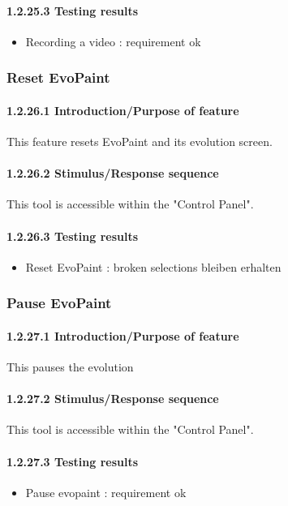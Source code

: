 \documentclass[titlepage,12pt]{scrartcl}
\begin{document}
\paragraph{1.2.25.3 Testing results}
\begin{itemize}
	\item Recording a video	: requirement ok
\end{itemize}


\subsubsection{Reset EvoPaint}
\paragraph{1.2.26.1 Introduction/Purpose of feature}
This feature resets EvoPaint and its evolution screen.
\paragraph{1.2.26.2 Stimulus/Response sequence}
This tool is accessible within the "Control Panel". 
\paragraph{1.2.26.3 Testing results}
\begin{itemize}
	\item Reset EvoPaint	: broken selections bleiben erhalten
\end{itemize}


\subsubsection{Pause EvoPaint}
\paragraph{1.2.27.1 Introduction/Purpose of feature}
This pauses the evolution
\paragraph{1.2.27.2 Stimulus/Response sequence}
This tool is accessible within the "Control Panel". 
\paragraph{1.2.27.3 Testing results}
\begin{itemize}
	\item Pause evopaint 	: requirement ok
\end{itemize}
\end{document}
